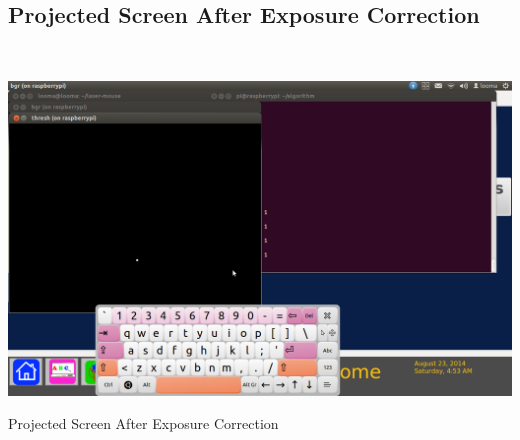 \documentclass[12pt, a4paper]{article}
\begin{document}
{\begin{appendices}
\section{Projected Screen After Exposure Correction}
~\\
\begin{appendixfig}
\includegraphics[scale=0.30]{projectorwithout.png}
\caption{Projected Screen After Exposure Correction}
\label{}
\end{appendixfig}
\newpage

\end{appendices}}
\end{document}

